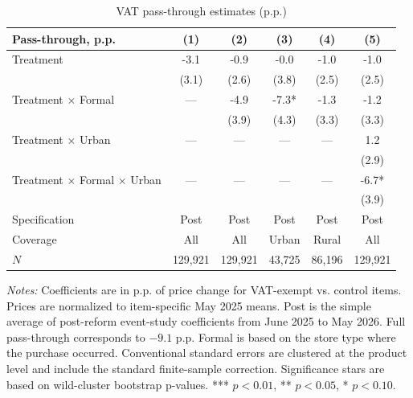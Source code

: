 \documentclass[12pt]{article}
\begin{document}
\begin{table}[H]
\centering
\caption{VAT pass-through estimates (p.p.)}
\label{tab:phone_pass_through_post_raw}
\begin{threeparttable}
\begin{tabular}{lccccc}
\toprule
Pass-through, p.p. & (1) & (2) & (3) & (4) & (5) \\
\midrule
Treatment & -3.1 & -0.9 & -0.0 & -1.0 & -1.0 \\
 & (3.1) & (2.6) & (3.8) & (2.5) & (2.5) \\
Treatment $\times$ Formal & --- & -4.9 & -7.3* & -1.3 & -1.2 \\
 &  & (3.9) & (4.3) & (3.3) & (3.3) \\
Treatment $\times$ Urban & --- & --- & --- & --- & 1.2 \\
 &  &  &  &  & (2.9) \\
Treatment $\times$ Formal $\times$ Urban & --- & --- & --- & --- & -6.7* \\
 &  &  &  &  & (3.9) \\
\midrule
Specification & Post & Post & Post & Post & Post \\
Coverage & All & All & Urban & Rural & All \\
$N$ & 129,921 & 129,921 & 43,725 & 86,196 & 129,921 \\
\bottomrule
\end{tabular}
\begin{tablenotes}[flushleft]
\scriptsize
\item \textit{Notes:} Coefficients are in p.p. of price change for VAT-exempt vs. control items. Prices are normalized to item-specific May 2025 means. Post is the simple average of post-reform event-study coefficients from June 2025 to May 2026. Full pass-through corresponds to $-9.1$ p.p. Formal is based on the store type where the purchase occurred. Conventional standard errors are clustered at the product level and include the standard finite-sample correction. Significance stars are based on wild-cluster bootstrap p-values. *** $p<0.01$, ** $p<0.05$, * $p<0.10$.
\end{tablenotes}
\end{threeparttable}
\end{table}
\end{document}
